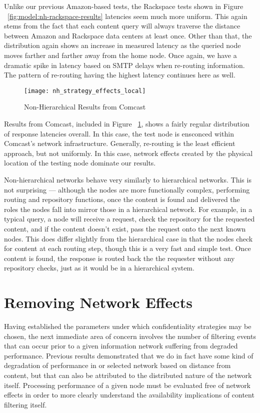 Unlike our previous Amazon-based tests, the Rackspace tests shown in Figure ~\ref{fig:model:nh-rackspace-results} latencies seem much more uniform.  This again stems from the fact that each content query will always traverse the distance between Amazon and Rackspace data centers at least once.  Other than that, the distribution again shows an increase in measured latency as the queried node moves farther and farther away from the home node.  Once again, we have a dramatic spike in latency based on SMTP delays when re-routing information.  The pattern of re-routing having the highest latency continues here as well.

\begin{figure}[!t]
\centering
\texttt{[image: nh\_strategy\_effects\_local]}
\caption{Non-Hierarchical Results from Comcast}
\label{fig:model:nh-comcast-results}
\end{figure}

Results from Comcast, included in Figure ~\ref{fig:model:nh-comcast-results}, shows a fairly regular distribution of response latencies overall.  In this case, the test node is ensconced within Comcast's network infrastructure.  Generally, re-routing is the least efficient approach, but not uniformly.  In this case, network effects created by the physical location of the testing node dominate our results.

Non-hierarchical networks behave very similarly to hierarchical networks.  This is not surprising --- although the nodes are more functionally complex, performing routing and repository functions, once the content is found and delivered the roles the nodes fall into mirror those in a hierarchical network.  For example, in a typical query, a node will receive a request, check the repository for the requested content, and if the content doesn't exist, pass the request onto the next known nodes.  This does differ slightly from the hierarchical case in that the nodes check for content at each routing step, though this is a very fast and simple test.  Once content is found, the response is routed back the the requester without any repository checks, just as it would be in a hierarchical system.

\section{Removing Network Effects}
Having established the parameters under which confidentiality strategies may be chosen, the next immediate area of concern involves the number of filtering events that can occur prior to a given information network suffering from degraded performance.  Previous results demonstrated that we do in fact have some kind of degradation of performance in or selected network based on distance from content, but that can also be attributed to the distributed nature of the network itself.  Processing performance of a given node must be evaluated free of network effects in order to more clearly understand the availability implications of content filtering itself.

